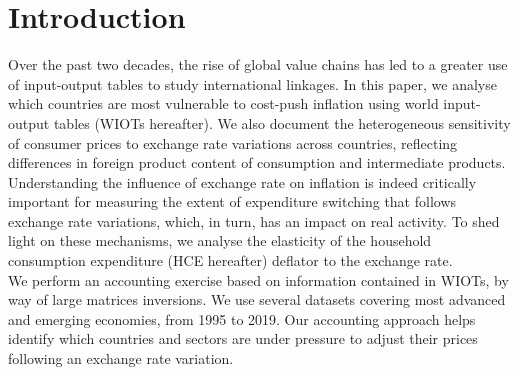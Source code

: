 \documentclass[11pt,a4paper]{paper} %
\begin{document}

\newpage 
\section*{Introduction}

Over the past two decades, the rise of global value chains has led to a greater use of input-output tables to study international linkages. 
In this paper, we analyse which countries are most vulnerable to cost-push inflation using world input-output tables (WIOTs hereafter). 
We also document the heterogeneous sensitivity of consumer prices to exchange rate variations across countries, reflecting differences in foreign product content of consumption and intermediate products. 
Understanding the influence of exchange rate on inflation is indeed critically important for measuring the extent of expenditure switching that follows exchange rate variations, which, in turn, has an impact on real activity.
To shed light on these mechanisms, we analyse the elasticity of the household consumption expenditure (HCE hereafter) deflator to the exchange rate.\\
We perform an accounting exercise based on information contained in WIOTs, by way of large matrices inversions.
We use several datasets covering most advanced and emerging economies, from 1995 to 2019. 
Our accounting approach helps identify which countries and sectors are under pressure to adjust their prices following an exchange rate variation.\\
\end{document}
